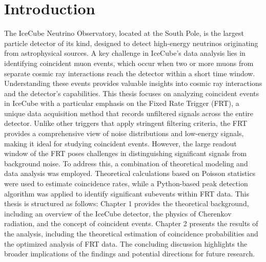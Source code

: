 \chapter{Introduction}

The IceCube Neutrino Observatory, located at the South Pole, is the largest particle detector of its kind, designed to detect high-energy neutrinos originating 
from astrophysical sources. A key challenge in IceCube's data analysis lies in identifying coincident muon events, which occur when two or more muons from separate 
cosmic ray interactions reach the detector within a short time window. Understanding these events provides valuable insights into cosmic ray interactions and the 
detector's capabilities.
This thesis focuses on analyzing coincident events in IceCube with a particular emphasis on the Fixed Rate Trigger (FRT), a unique data acquisition method that 
records unfiltered signals across the entire detector. Unlike other triggers that apply stringent filtering criteria, the FRT provides a comprehensive view of 
noise distributions and low-energy signals, making it ideal for studying coincident events. However, the large readout window of the FRT poses challenges in 
distinguishing significant signals from background noise.
To address this, a combination of theoretical modeling and data analysis was employed. Theoretical calculations based on Poisson statistics were used to estimate 
coincidence rates, while a Python-based peak detection algorithm was applied to identify significant subevents within FRT data. 
This thesis is structured as follows: Chapter 1 provides the theoretical background, including an overview of the IceCube detector, the physics of Cherenkov 
radiation, and the concept of coincident events. Chapter 2 presents the results of the analysis, including the theoretical estimation of coincidence probabilities 
and the optimized analysis of FRT data. The concluding discussion highlights the broader implications of the findings and potential directions for future research.
